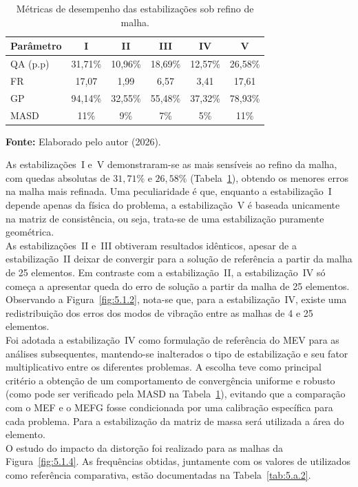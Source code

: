 \begin{table}[htbp]
    \centering
    \caption{Métricas de desempenho das estabilizações sob refino de malha.}
    \label{tab:5.a.1}
    \small %
    \begin{tabular}{lccccc}
        \toprule
        \textbf{Parâmetro} & \textbf{I} & \textbf{II} & \textbf{III} & \textbf{IV} & \textbf{V} \\
        \midrule
        QA (p.p) & 31,71\% & 10,96\% & 18,69\% & 12,57\% & 26,58\% \\
        FR       & 17,07   & 1,99    & 6,57    & 3,41    & 17,61   \\
        GP       & 94,14\% & 32,55\% & 55,48\% & 37,32\% & 78,93\% \\
        MASD     & 11\%    & 9\%     & 7\%     & 5\%     & 11\%    \\
        \bottomrule
    \end{tabular}
    
    \vspace{0.2cm}
    \raggedright
    \textbf{Fonte:} Elaborado pelo autor (2026).
\end{table}

\indent As estabilizações~\textrm{I} e~\textrm{V} demonstraram-se as mais sensíveis ao refino da malha, com quedas absolutas de $31,71\%$ e $26,58\%$ (Tabela~\ref{tab:5.a.1}), obtendo os menores erros na malha mais refinada. Uma peculiaridade é que, enquanto a estabilização~\textrm{I} depende apenas da física do problema, a estabilização~\textrm{V} é baseada unicamente na matriz de consistência, ou seja, trata-se de uma estabilização puramente geométrica.\\
\indent As estabilizações~\textrm{II} e~\textrm{III} obtiveram resultados idênticos, apesar de a estabilização~\textrm{II} deixar de convergir para a solução de referência a partir da malha de 25 elementos. Em contraste com a estabilização~\textrm{II}, a estabilização~\textrm{IV} só começa a apresentar queda do erro de solução a partir da malha de 25 elementos. Observando a Figura~\ref{fig:5.1.2}, nota-se que, para a estabilização~\textrm{IV}, existe uma redistribuição dos erros dos modos de vibração entre as malhas de 4 e 25 elementos.\\
\indent Foi adotada a estabilização~\textrm{IV} como formulação de referência do MEV para as análises subsequentes, mantendo-se inalterados o tipo de estabilização e seu fator multiplicativo entre os diferentes problemas. A escolha teve como principal critério a obtenção de um comportamento de convergência uniforme e robusto (como pode ser verificado pela MASD na Tabela~\ref{tab:5.a.1}), evitando que a comparação com o MEF e o MEFG fosse condicionada por uma calibração específica para cada problema. Para a estabilização da matriz de massa será utilizada a área do elemento.\\
\indent O estudo do impacto da distorção foi realizado para as malhas da Figura~\ref{fig:5.1.4}. As frequências obtidas, juntamente com os valores de \citet{torii2012analise} utilizados como referência comparativa, estão documentadas na Tabela~\ref{tab:5.a.2}.


